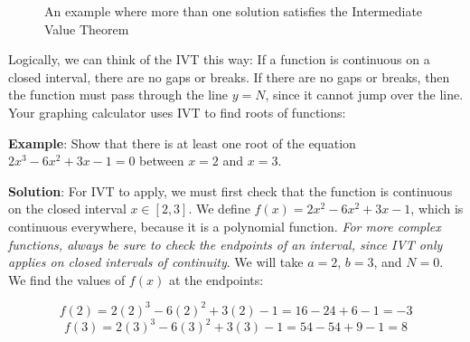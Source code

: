 \begin{figure}[htbp]
\centering
{}
\caption{An example where more than one solution satisfies the Intermediate 
Value Theorem}
\label{fig:IVT2}
\end{figure}

Logically, we can think of the IVT this way: If a function is continuous on a 
closed interval, there are no gaps or breaks. If there are no gaps or breaks, 
then the function must pass through the line $y=N$, since it cannot jump over 
the line. Your graphing calculator uses IVT to find roots of functions: 

\textbf{Example}: Show that there is at least one root of the equation $2x^3 - 
6x^2 + 3x - 1 = 0$ between $x = 2$ and $x = 3$.

\textbf{Solution}: For IVT to apply, we must first check that the function is 
continuous on the closed interval $x \in \left[2, 3\right]$. We define $f(x) = 
2x^2-6x^2+3x-1$, which is continuous everywhere, because it is a polynomial 
function. \textit{For more complex functions, always be sure to check the 
endpoints of an interval, since IVT only applies on closed intervals of 
continuity}. We will take $a = 2$, $b = 3$, and $N = 0$. We find the values of 
$f(x)$ at the endpoints: 

$$f(2) = 2(2)^3 - 6(2)^2 + 3(2) - 1 = 16 - 24 + 6 - 1 = -3$$
$$f(3) = 2(3)^3 - 6(3)^2 + 3(3) - 1 = 54 - 54 + 9 - 1 = 8$$

